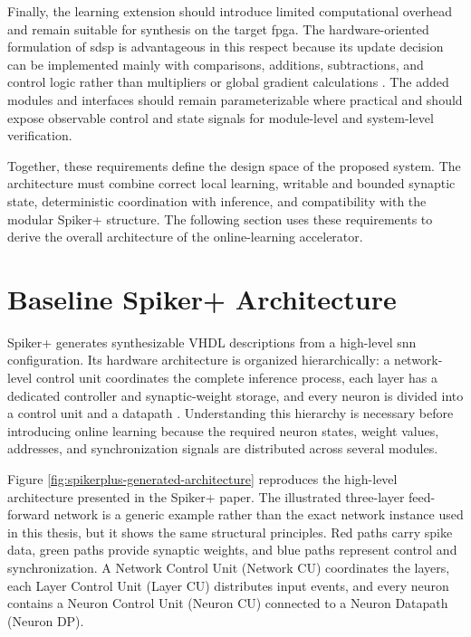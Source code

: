 Finally, the learning extension should introduce limited computational overhead and remain suitable for synthesis on the target \gls{fpga}. The hardware-oriented formulation of \gls{sdsp} is advantageous in this respect because its update decision can be implemented mainly with comparisons, additions, subtractions, and control logic rather than multipliers or global gradient calculations \cite{Frenkel2019ODIN}. The added modules and interfaces should remain parameterizable where practical and should expose observable control and state signals for module-level and system-level verification.

Together, these requirements define the design space of the proposed system. The architecture must combine correct local learning, writable and bounded synaptic state, deterministic coordination with inference, and compatibility with the modular Spiker+ structure. The following section uses these requirements to derive the overall architecture of the online-learning accelerator.

\section{Baseline Spiker+ Architecture}
\label{subsec: baseline spikerplus architecture}

Spiker+ generates synthesizable VHDL descriptions from a high-level \gls{snn} configuration. Its hardware architecture is organized hierarchically: a network-level control unit coordinates the complete inference process, each layer has a dedicated controller and synaptic-weight storage, and every neuron is divided into a control unit and a datapath \cite{Carpegna2022,Carpegna2025}. Understanding this hierarchy is necessary before introducing online learning because the required neuron states, weight values, addresses, and synchronization signals are distributed across several modules.

Figure \ref{fig:spikerplus-generated-architecture} reproduces the high-level architecture presented in the Spiker+ paper. The illustrated three-layer feed-forward network is a generic example rather than the exact network instance used in this thesis, but it shows the same structural principles. Red paths carry spike data, green paths provide synaptic weights, and blue paths represent control and synchronization. A Network Control Unit (Network CU) coordinates the layers, each Layer Control Unit (Layer CU) distributes input events, and every neuron contains a Neuron Control Unit (Neuron CU) connected to a Neuron Datapath (Neuron DP).

